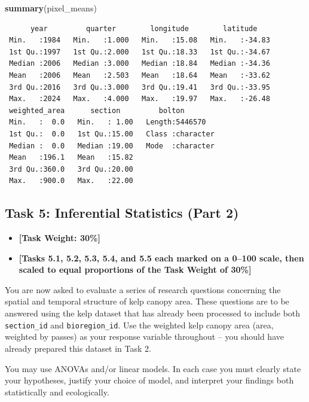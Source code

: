 \documentclass[
  british,
  10pt,
]{article}
\newenvironment{Shaded}{\begin{snugshade}}{\end{snugshade}}
\newcommand{\FunctionTok}[1]{\textcolor[rgb]{0.13,0.29,0.53}{\textbf{#1}}}
\newcommand{\NormalTok}[1]{#1}
\providecommand{\tightlist}{%
  \setlength{\itemsep}{0pt}\setlength{\parskip}{0pt}}
\let\oldtexttt\texttt
\renewcommand{\texttt}[1]{\oldtexttt{\small #1}}
\begin{document}
\begin{Shaded}
\begin{Highlighting}[]
\FunctionTok{summary}\NormalTok{(pixel\_means)}
\end{Highlighting}
\end{Shaded}

\begin{verbatim}
      year         quarter        longitude        latitude     
 Min.   :1984   Min.   :1.000   Min.   :15.08   Min.   :-34.83  
 1st Qu.:1997   1st Qu.:2.000   1st Qu.:18.33   1st Qu.:-34.67  
 Median :2006   Median :3.000   Median :18.84   Median :-34.36  
 Mean   :2006   Mean   :2.503   Mean   :18.64   Mean   :-33.62  
 3rd Qu.:2016   3rd Qu.:3.000   3rd Qu.:19.41   3rd Qu.:-33.95  
 Max.   :2024   Max.   :4.000   Max.   :19.97   Max.   :-26.48  
 weighted_area      section         bolton         
 Min.   :  0.0   Min.   : 1.00   Length:5446570    
 1st Qu.:  0.0   1st Qu.:15.00   Class :character  
 Median :  0.0   Median :19.00   Mode  :character  
 Mean   :196.1   Mean   :15.82                     
 3rd Qu.:360.0   3rd Qu.:20.00                     
 Max.   :900.0   Max.   :22.00                     
\end{verbatim}

\subsection{Task 5: Inferential Statistics (Part
2)}\label{task-5-inferential-statistics-part-2}

\begin{itemize}
\tightlist
\item
  \textbf{{[}Task Weight: 30\%{]}}
\item
  \textbf{{[}Tasks 5.1, 5.2, 5.3, 5.4, and 5.5 each marked on a 0--100
  scale, then scaled to equal proportions of the Task Weight of 30\%{]}}
\end{itemize}

You are now asked to evaluate a series of research questions concerning
the spatial and temporal structure of kelp canopy area. These questions
are to be answered using the kelp dataset that has already been
processed to include both \texttt{section\_id} and
\texttt{bioregion\_id}. Use the weighted kelp canopy area (area,
weighted by passes) as your response variable throughout -- you should
have already prepared this dataset in Task 2.

You may use ANOVAs and/or linear models. In each case you must clearly
state your hypotheses, justify your choice of model, and interpret your
findings both statistically and ecologically.
\end{document}
